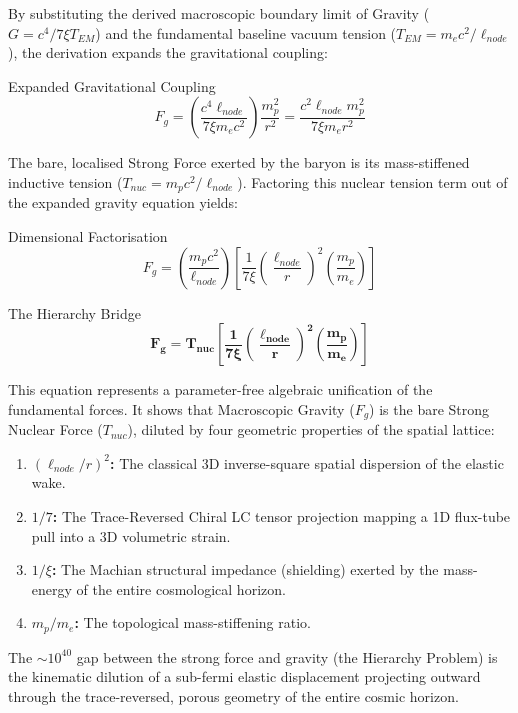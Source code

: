 By substituting the derived macroscopic boundary limit of Gravity ($G = c^4 / 7\xi T_{EM}$) and the fundamental baseline vacuum tension ($T_{EM} = m_e c^2 / \ell_{node}$), the derivation expands the gravitational coupling:
\begin{resultbox}{Expanded Gravitational Coupling}
\begin{equation}
F_g = \left( \frac{c^4 \ell_{node}}{7 \xi m_e c^2} \right) \frac{m_p^2}{r^2} = \frac{c^2 \ell_{node} m_p^2}{7 \xi m_e r^2}
\end{equation}
\end{resultbox}

The bare, localised Strong Force exerted by the baryon is its mass-stiffened inductive tension ($T_{nuc} = m_p c^2 / \ell_{node}$). Factoring this nuclear tension term out of the expanded gravity equation yields:

\begin{resultbox}{Dimensional Factorisation}
\begin{equation}
F_g = \left( \frac{m_p c^2}{\ell_{node}} \right) \left[ \frac{1}{7 \xi} \left(\frac{\ell_{node}}{r}\right)^2 \left(\frac{m_p}{m_e}\right) \right]
\end{equation}
\end{resultbox}

\begin{resultbox}{The Hierarchy Bridge}
\begin{equation}
\mathbf{F_g = T_{nuc} \left[ \frac{1}{7 \xi} \left(\frac{\ell_{node}}{r}\right)^2 \left(\frac{m_p}{m_e}\right) \right]}
\end{equation}
\end{resultbox}

This equation represents a parameter-free algebraic unification of the fundamental forces. It shows that Macroscopic Gravity ($F_g$) is the bare Strong Nuclear Force ($T_{nuc}$), diluted by four geometric properties of the spatial lattice:
\begin{enumerate}
    \item \textbf{$(\ell_{node}/r)^2$:} The classical 3D inverse-square spatial dispersion of the elastic wake.
    \item \textbf{$1/7$:} The Trace-Reversed Chiral LC tensor projection mapping a 1D flux-tube pull into a 3D volumetric strain.
    \item \textbf{$1/\xi$:} The Machian structural impedance (shielding) exerted by the mass-energy of the entire cosmological horizon.
    \item \textbf{$m_p/m_e$:} The topological mass-stiffening ratio.
\end{enumerate}

The $\sim 10^{40}$ gap between the strong force and gravity (the Hierarchy Problem) is the kinematic dilution of a sub-fermi elastic displacement projecting outward through the trace-reversed, porous geometry of the entire cosmic horizon.
